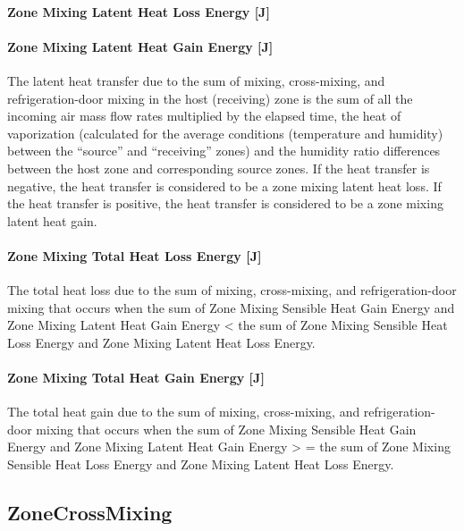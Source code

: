 \paragraph{Zone Mixing Latent Heat Loss Energy {[}J{]}}\label{zone-mixing-latent-heat-loss-energy-j}

\paragraph{Zone Mixing Latent Heat Gain Energy {[}J{]}}\label{zone-mixing-latent-heat-gain-energy-j}

The latent heat transfer due to the sum of mixing, cross-mixing, and refrigeration-door mixing in the host (receiving) zone is the sum of all the incoming air mass flow rates multiplied by the elapsed time, the heat of vaporization (calculated for the average conditions (temperature and humidity) between the ``source'' and ``receiving'' zones) and the humidity ratio differences between the host zone and corresponding source zones. If the heat transfer is negative, the heat transfer is considered to be a zone mixing latent heat loss. If the heat transfer is positive, the heat transfer is considered to be a zone mixing latent heat gain.

\paragraph{Zone Mixing Total Heat Loss Energy {[}J{]}}\label{zone-mixing-total-heat-loss-energy-j}

The total heat loss due to the sum of mixing, cross-mixing, and refrigeration-door mixing that occurs when the sum of Zone Mixing Sensible Heat Gain Energy and Zone Mixing Latent Heat Gain Energy \textless{} the sum of Zone Mixing Sensible Heat Loss Energy and Zone Mixing Latent Heat Loss Energy.

\paragraph{Zone Mixing Total Heat Gain Energy {[}J{]}}\label{zone-mixing-total-heat-gain-energy-j}

The total heat gain due to the sum of mixing, cross-mixing, and refrigeration-door mixing that occurs when the sum of Zone Mixing Sensible Heat Gain Energy and Zone Mixing Latent Heat Gain Energy \textgreater{} = the sum of Zone Mixing Sensible Heat Loss Energy and Zone Mixing Latent Heat Loss Energy.

\subsection{ZoneCrossMixing}\label{zonecrossmixing}


